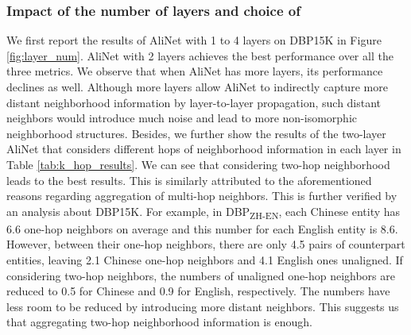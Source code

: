 \documentclass[letterpaper]{article} \usepackage{aaai20}  \usepackage{times}  \usepackage{helvet} \usepackage{courier}  \usepackage[hyphens]{url}  \usepackage{graphicx} \urlstyle{rm} \def\UrlFont{\rm}  \frenchspacing  \setlength{\pdfpagewidth}{8.5in}  \setlength{\pdfpageheight}{11in}  \usepackage{amsmath}
\begin{document}
\subsubsection{Impact of the number of layers and choice of }
We first report the results of AliNet with 1 to 4 layers on DBP15K in Figure \ref{fig:layer_num}. AliNet with 2 layers achieves the best performance over all the three metrics. We observe that when AliNet has more layers, its performance declines as well. Although more layers allow AliNet to indirectly capture more distant neighborhood information by layer-to-layer propagation, such distant neighbors would introduce much noise and lead to more non-isomorphic neighborhood structures. Besides, we further show the results of the two-layer AliNet that considers different hops of neighborhood information in each layer in Table \ref{tab:k_hop_results}. We can see that considering two-hop neighborhood leads to the best results. This is similarly attributed to the aforementioned reasons regarding aggregation of multi-hop neighbors. This is further verified by an analysis about DBP15K. For example, in DBP\textsubscript{ZH-EN}, each Chinese entity has 6.6 one-hop neighbors on average and this number for each English entity is 8.6. However, between their one-hop neighbors, there are only 4.5 pairs of counterpart entities, leaving 2.1 Chinese one-hop neighbors and 4.1 English ones unaligned. If considering two-hop neighbors, the numbers of unaligned one-hop neighbors are reduced to 0.5 for Chinese and 0.9 for English, respectively. The numbers have less room to be reduced by introducing more distant neighbors. This suggests us that aggregating two-hop neighborhood information is enough.

\begin{table}[!t]
	\centering
	\caption{Results on DBP15K w.r.t.  values}
	\label{tab:k_hop_results}
\end{table}
\end{document}
